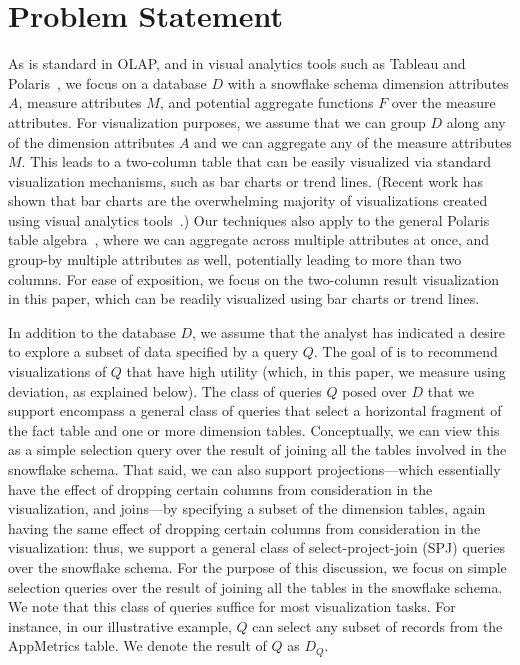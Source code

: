 \section{Problem Statement}
\label{sec:problem_statement}


As is standard in OLAP, and in visual analytics tools such as Tableau and Polaris~\cite{tableau,polaris},
we focus on a database $D$ with a snowflake schema
dimension attributes $A$, measure attributes $M$, and potential
aggregate functions $F$ over the measure attributes.  
For visualization purposes, we assume that we can group $D$ along any of the dimension attributes $A$ 
and we can aggregate any of the measure attributes $M$.
This leads to a two-column table that can be easily visualized
via standard visualization mechanisms, such as bar charts or trend lines.
(Recent work has shown that bar charts are the overwhelming majority of visualizations
created using visual analytics tools~\cite{DBLP:journals/pvldb/MortonBGM14}.) 
Our techniques also apply to the general Polaris table algebra~\cite{polaris}, where
we can aggregate across multiple attributes at once, and group-by multiple attributes as well, 
potentially leading to more than two columns.
For ease of exposition, we focus on the two-column result visualization in this paper,
which can be readily visualized using bar charts or trend lines.

In addition to the database $D$, we assume that the analyst has indicated
a desire to explore a subset of data specified by a query $Q$.
The goal of \SeeDB is to recommend visualizations of $Q$ that have
high utility (which, in this paper, we measure using deviation, as explained below).
The class of queries $Q$ posed over $D$ that we support encompass a general class of queries 
that select a horizontal fragment of the fact table and one or more dimension tables.
Conceptually, we can view this as a simple selection query over the result of joining all
the tables involved in the snowflake schema. 
That said, we can also support projections---which essentially have the effect
of dropping certain columns from consideration in the visualization, and
joins---by specifying a subset of the dimension tables, again having 
the same effect of dropping certain columns from consideration in the visualization: thus,
we support a general class of select-project-join (SPJ) queries over the snowflake schema.
For the purpose of this discussion, we focus on simple selection
queries over the result of joining all the tables in the snowflake schema.
We note that this class of queries 
suffice for most visualization tasks.
For instance, in our illustrative example, $Q$ can select any subset of records from the
AppMetrics table. 
We denote the result of $Q$ as $D_Q$.


